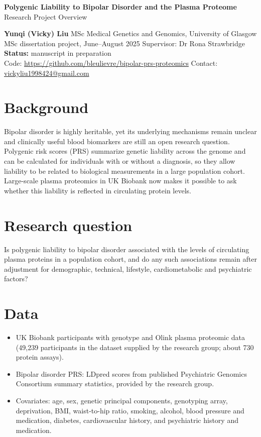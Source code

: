 \documentclass[10.5pt]{article}
\begin{document}
{\color{accent}\LARGE\bfseries Polygenic Liability to Bipolar Disorder and the Plasma Proteome}\\[3pt]
{\large Research Project Overview}

\vspace{6pt}
\textbf{Yunqi (Vicky) Liu} \quad MSc Medical Genetics and Genomics, University of Glasgow\\
MSc dissertation project, June--August 2025 \quad Supervisor: Dr Rona Strawbridge\\
\textbf{Status:} manuscript in preparation\\
Code: \url{https://github.com/bleulievre/bipolar-prs-proteomics} \quad Contact: \href{mailto:vickyliu1998424@gmail.com}{vickyliu1998424@gmail.com}

\section{Background}
Bipolar disorder is highly heritable, yet its underlying mechanisms remain unclear and clinically useful blood
biomarkers are still an open research question. Polygenic risk scores (PRS) summarize genetic liability across
the genome and can be calculated for individuals with or without a diagnosis, so they allow liability to be related to
biological measurements in a large population cohort. Large-scale plasma proteomics in UK Biobank now makes it
possible to ask whether this liability is reflected in circulating protein levels.

\section{Research question}
Is polygenic liability to bipolar disorder associated with the levels of circulating plasma proteins in a
population cohort, and do any such associations remain after adjustment for demographic, technical,
lifestyle, cardiometabolic and psychiatric factors?

\section{Data}
\begin{itemize}
  \item UK Biobank participants with genotype and Olink plasma proteomic data (49,239 participants in the
        dataset supplied by the research group; about 730 protein assays).
  \item Bipolar disorder PRS: LDpred scores from published Psychiatric Genomics Consortium summary statistics,
        provided by the research group.
  \item Covariates: age, sex, genetic principal components, genotyping array, deprivation, BMI, waist-to-hip
        ratio, smoking, alcohol, blood pressure and medication, diabetes, cardiovascular history, and
        psychiatric history and medication.
\end{itemize}
\end{document}
